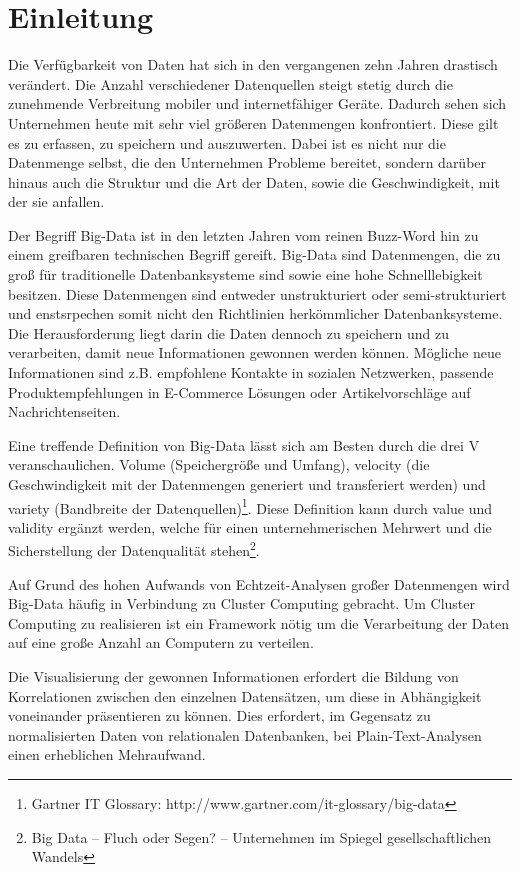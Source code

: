 \chapter{Einleitung}
\label{cha:Einleitung}

Die Verfügbarkeit von Daten hat sich in den vergangenen zehn Jahren drastisch verändert. Die Anzahl verschiedener Datenquellen steigt stetig durch die zunehmende Verbreitung mobiler und internetfähiger Geräte. Dadurch sehen sich Unternehmen heute mit sehr viel größeren Datenmengen konfrontiert. Diese gilt es zu erfassen, zu speichern und auszuwerten. Dabei ist es nicht nur die Datenmenge selbst, die den Unternehmen Probleme bereitet, sondern darüber hinaus auch die Struktur und die Art der Daten, sowie die Geschwindigkeit, mit der sie anfallen.

Der Begriff Big-Data ist in den letzten Jahren vom reinen Buzz-Word hin zu einem greifbaren technischen Begriff gereift. Big-Data sind Datenmengen, die zu groß für traditionelle Datenbanksysteme sind sowie eine hohe Schnelllebigkeit besitzen. Diese Datenmengen sind entweder unstrukturiert oder semi-strukturiert und enstsrpechen somit nicht den Richtlinien herkömmlicher Datenbanksysteme. Die Herausforderung liegt darin die Daten dennoch zu speichern und zu verarbeiten, damit neue Informationen gewonnen werden können. Mögliche neue Informationen sind z.B. empfohlene Kontakte in sozialen Netzwerken, passende Produktempfehlungen in E-Commerce Lösungen oder Artikelvorschläge auf Nachrichtenseiten. 

Eine treffende Definition von Big-Data lässt sich am Besten durch die drei V veranschaulichen. Volume (Speichergröße und Umfang), velocity (die Geschwindigkeit mit der Datenmengen generiert und transferiert werden) und variety (Bandbreite der Datenquellen)\footnote{Gartner IT Glossary: http://www.gartner.com/it-glossary/big-data}. Diese Definition kann durch value und validity ergänzt werden, welche für einen unternehmerischen Mehrwert und die Sicherstellung der Datenqualität stehen\footnote{Big Data – Fluch oder Segen? – Unternehmen im Spiegel gesellschaftlichen Wandels}.

Auf Grund des hohen Aufwands von Echtzeit-Analysen großer Datenmengen wird Big-Data häufig in Verbindung zu Cluster Computing gebracht. Um Cluster Computing zu realisieren ist ein Framework nötig um die Verarbeitung der Daten auf eine große Anzahl an Computern zu verteilen.

Die Visualisierung der gewonnen Informationen erfordert die Bildung von Korrelationen zwischen den einzelnen Datensätzen, um diese in Abhängigkeit voneinander präsentieren zu können. Dies erfordert, im Gegensatz zu normalisierten Daten von relationalen Datenbanken, bei Plain-Text-Analysen einen erheblichen Mehraufwand. 
